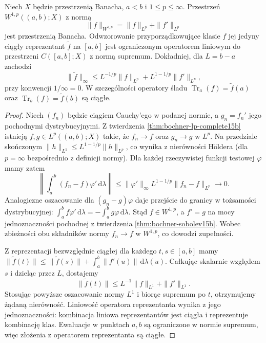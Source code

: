 \begin{twierdzenie}
\label{thm:bochner-sobolev-banach-traces15b}
Niech $X$ będzie przestrzenią Banacha, $a<b$ i
$1\le p\le\infty$. Przestrzeń $W^{1,p}((a,b);X)$
z normą
\[
 \|f\|_{W^{1,p}}=\|f\|_{L^p}+\|f'\|_{L^p}
\]
jest przestrzenią Banacha.
Odwzorowanie przyporządkowujące klasie $f$ jej jedyny
ciągły reprezentant $\widetilde f$ na $[a,b]$
jest ograniczonym operatorem liniowym do przestrzeni
$C([a,b];X)$ z normą supremum. Dokładniej, dla
$L=b-a$ zachodzi
\[
 \|\widetilde f\|_\infty
 \le L^{-1/p}\|f\|_{L^p}
      +L^{1-1/p}\|f'\|_{L^p},
\]
przy konwencji $1/\infty=0$.
W szczególności operatory śladu
$\operatorname{Tr}_a(f)=\widetilde f(a)$ oraz
$\operatorname{Tr}_b(f)=\widetilde f(b)$ są ciągłe.
\end{twierdzenie}
\begin{proof}
Niech $(f_n)$ będzie ciągiem Cauchy'ego w podanej
normie, a $g_n=f_n'$ jego pochodnymi dystrybucyjnymi.
Z twierdzenia \ref{thm:bochner-lp-complete15b}
istnieją $f,g\in L^p((a,b);X)$ takie, że
$f_n\to f$ oraz $g_n\to g$ w $L^p$.
Na przedziale skończonym
$\|h\|_{L^1}\le L^{1-1/p}\|h\|_{L^p}$,
co wynika z nierówności Höldera (dla $p=\infty$
bezpośrednio z definicji normy).
Dla każdej rzeczywistej funkcji testowej $\varphi$
mamy zatem
\[
 \left\|\int_a^b(f_n-f)\varphi'\,\mathrm d\lambda\right\|
 \le\|\varphi'\|_\infty L^{1-1/p}\|f_n-f\|_{L^p}
 \longrightarrow0.
\]
Analogiczne oszacowanie dla $(g_n-g)\varphi$ daje
przejście do granicy w tożsamości dystrybucyjnej:
$\int_a^b f\varphi'\,\mathrm d\lambda
=-\int_a^b g\varphi\,\mathrm d\lambda$.
Stąd $f\in W^{1,p}$, a $f'=g$ na mocy
jednoznaczności pochodnej z twierdzenia
\ref{thm:bochner-sobolev15b}.
Wobec zbieżności obu składników normy
$f_n\to f$ w $W^{1,p}$, co dowodzi zupełności.

Z reprezentacji bezwzględnie ciągłej dla każdego
$t,s\in[a,b]$ mamy
$\|\widetilde f(t)\|\le\|\widetilde f(s)\|
+\int_a^b\|f'(u)\|\,\mathrm d\lambda(u)$.
Całkując skalarnie względem $s$ i dzieląc przez $L$,
dostajemy
\[
 \|\widetilde f(t)\|
 \le L^{-1}\|f\|_{L^1}+\|f'\|_{L^1}.
\]
Stosując powyższe oszacowanie normy $L^1$
i biorąc supremum po $t$, otrzymujemy żądaną nierówność.
Liniowość operatora reprezentanta wynika z jego
jednoznaczności: kombinacja liniowa reprezentantów
jest ciągła i reprezentuje kombinację klas.
Ewaluacje w punktach $a,b$ są ograniczone w normie
supremum, więc złożenia z operatorem reprezentanta
są ciągłe.
\end{proof}

